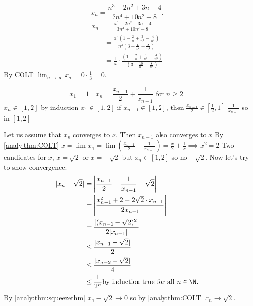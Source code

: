 \documentclass[10pt, a4paper]{article}
\begin{document}
\begin{example}
    \[
    x_n = \frac{n ^ 3 - 2n ^ 2 + 3n - 4}{3n ^ 4 + 10n ^ 2 - 8}.
    \]
    \begin{align*}
        x_n &= \frac{n ^ 3 - 2n ^ 2 + 3n - 4}{3n ^ 4 + 10n ^ 2 - 8} \\
        &= \frac{n ^ 3 \left(1 - \frac{2}{n} + \frac{3}{n ^ 2} - \frac{4}{n ^ 3}\right)}{n ^ 4 \left(3 + \frac{10}{n ^ 2} - \frac{8}{n ^ 4} \right)} \\
        &= \frac{1}{n} \cdot \frac{\left(1 - \frac{2}{n} + \frac{3}{n ^ 2} - \frac{4}{n ^ 3}\right)}{\left(3 + \frac{10}{n ^ 2} - \frac{8}{n ^ 4} \right)}
    \end{align*}
    By COLT $\lim_{n \to \infty}x_n = 0 \cdot \frac{1}{3} = 0$.
\end{example}

\begin{example}
    \[
    x_1 = 1\quad x_n = \frac{x_{n - 1}}{2} + \frac{1}{x_{n - 1}}\text{ for } n \geq 2.
    \]
    $x_n \in [1, 2]$ by induction $x_1 \in [1, 2]$
    if $x_{n - 1} \in [1, 2]$,
    then $\frac{x_{n - 1}}{2} \in \left[\frac{1}{2}, 1\right]$
    $\frac{1}{x_{n - 1}}$ so in $[1, 2]$

    Let us assume that $x_n$ converges to $x$.
    Then $x_{n - 1}$ also converges to $x$
    By \autoref{analy:thm:COLT} $x = \lim x_n = \lim \left(\frac{x_{n - 1}}{2} + \frac{1}{x_{n - 1}}\right) = \frac{x}{2} + \frac{1}{x} \implies x ^ 2 = 2$
    Two candidates for $x$,
    $x = \sqrt{2}$ or $x = -\sqrt{2}$ but $x_n \in [1, 2]$ so no $-\sqrt{2}$.
    Now let's try to show convergence:
    \begin{align*}
        |x_n - \sqrt{2}| &= \left|\frac{x_{n - 1}}{2} + \frac{1}{x_{n - 1}} - \sqrt{2}\right| \\
        &= \left|\frac{x_{n - 1} ^ 2 + 2 - 2\sqrt{2}\cdot x_{n - 1}}{2x_{n - 1}}\right| \\
        &= \frac{|(x_{n - 1} - \sqrt{2}) ^ 2|}{2|x_{n - 1}|} \\
        &\leq \frac{|x_{n - 1} - \sqrt{2}|}{2} \\
        &\leq \frac{|x_{n - 2} - \sqrt{2}|}{4} \\
        &\leq \frac{1}{2 ^ n} \text{by induction true for all } n \in \N.
    \end{align*}
    By \autoref{analy:thm:squeezethm} $x_n - \sqrt{2} \to 0$ so by \autoref{analy:thm:COLT}
    $x_n \to \sqrt{2}$.
\end{example}
\end{document}
